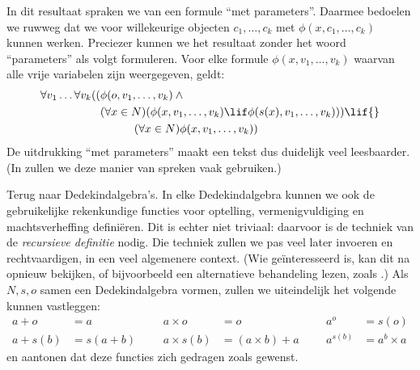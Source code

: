 \documentclass[openany]{memoir}
\begin{document}
In dit resultaat spraken we van een formule ``met parameters''.
Daarmee bedoelen we ruwweg dat we voor willekeurige objecten $c_1,
\ldots, c_k$ met $\phi(x, c_1, \ldots, c_k)$ kunnen werken. Preciezer
kunnen we het resultaat zonder het woord ``parameters'' als volgt
formuleren. Voor elke formule $\phi(x, v_1, \ldots, v_k)$ waarvan alle
vrije variabelen zijn weergegeven, geldt:
	\begin{align*}
			\forall v_1 \ldots \forall v_k((&\phi(o, v_1,\ldots, v_k) \land {}\\
			&	(\forall x \in N)(\phi(x,v_1, \ldots, v_k) \lif \phi(s(x), v_1,\ldots, v_k))) \lif {}\\
			&\hspace{3em} (\forall x \in N)\phi(x, v_1,\ldots, v_k))
	\end{align*}
De uitdrukking ``met parameters'' maakt een tekst dus duidelijk veel
leesbaarder. (In  zullen we deze manier van spreken
vaak gebruiken.)

Terug naar Dedekindalgebra's. In elke Dedekindalgebra kunnen we ook de
gebruikelijke rekenkundige functies voor optelling, vermenigvuldiging
en machtsverheffing definiëren. Dit is echter niet triviaal: daarvoor
is de techniek van de \emph{recursieve definitie} nodig. Die techniek
zullen we pas veel later invoeren en rechtvaardigen, in een veel
algemenere context. (Wie geïnteresseerd is, kan dit na
 opnieuw bekijken, of bijvoorbeeld
een alternatieve behandeling lezen, zoals \citealt[pp.~95--8]{Potter2004}.)
Als $N, s, o$ samen een Dedekindalgebra vormen, zullen we uiteindelijk
het volgende kunnen vastleggen:
\begin{align*}
	{a} + {o} &= {a} & & & {a} \times {o} &= {o} & & & {a}^{o} &= s(o)\\
{a} + {s}({b}) &= {s}({a}+{b}) &&& {a} \times {s}({b}) &= ({a}\times {b}) + {a}  & & & {a}^{{s}({b})} &= {a}^{b} \times {a}
\end{align*}
en aantonen dat deze functies zich gedragen zoals gewenst.
\endgroup

\begingroup
\def\olfilename{OLP-0053}
\def\olfilepath{content/sets-functions-relations/infinite/}
\hypertarget{unit-OLP-0053}{}
%
\end{document}
